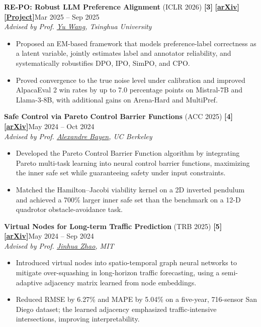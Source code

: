 \documentclass[10pt,letterpaper]{article}
\newcommand{\ulink}[2]{\href{#1}{\underline{#2}}}
\newcommand{\linktag}[2]{\textbf{[\ulink{#1}{#2}]}}
\newcommand{\project}[3]{%
  \vspace{6pt}%
  {#1}\hfill #2\\
  \textit{#3}\par\vspace{2pt}}
\begin{document}
\project{\textbf{RE-PO: Robust LLM Preference Alignment} (ICLR 2026) \textbf{[3]}
         \linktag{https://arxiv.org/abs/2509.24159}{arXiv} \linktag{https://repo-alignment.github.io/}{Project}}{Mar 2025 -- Sep 2025}
        {Advised by Prof. \ulink{https://web.ee.tsinghua.edu.cn/wangyu/en/}{Yu Wang}, Tsinghua University}
\begin{itemize}
  \item Proposed an EM-based framework that models preference-label correctness as a latent variable, jointly estimates
    label and annotator reliability, and systematically robustifies DPO, IPO, SimPO, and CPO.
  \item Proved convergence to the true noise level under calibration and improved AlpacaEval 2 win rates by up to 7.0
    percentage points on Mistral-7B and Llama-3-8B, with additional gains on Arena-Hard and MultiPref.
\end{itemize}

\project{\textbf{Safe Control via Pareto Control Barrier Functions} (ACC 2025) \textbf{[4]}
         \linktag{https://arxiv.org/abs/2410.04260}{arXiv}}{May 2024 -- Oct 2024}
        {Advised by Prof. \ulink{https://bayen.berkeley.edu/alex-bayen}{Alexandre Bayen}, UC Berkeley}
\begin{itemize}
  \item Developed the Pareto Control Barrier Function algorithm by integrating Pareto multi-task learning into neural
    control barrier functions, maximizing the inner safe set while guaranteeing safety under input constraints.
  \item Matched the Hamilton--Jacobi viability kernel on a 2D inverted pendulum and achieved a 700\% larger inner safe
    set than the benchmark on a 12-D quadrotor obstacle-avoidance task.
\end{itemize}

\project{\textbf{Virtual Nodes for Long-term Traffic Prediction} (TRB 2025) \textbf{[5]}
         \linktag{https://arxiv.org/abs/2501.10048}{arXiv}}{May 2024 -- Sep 2024}
        {Advised by Prof. \ulink{https://zhaojinhua.com/}{Jinhua Zhao}, MIT}
\begin{itemize}
  \item Introduced virtual nodes into spatio-temporal graph neural networks to mitigate over-squashing in long-horizon
    traffic forecasting, using a semi-adaptive adjacency matrix learned from node embeddings.
  \item Reduced RMSE by 6.27\% and MAPE by 5.04\% on a five-year, 716-sensor San Diego dataset; the learned adjacency
    emphasized traffic-intensive intersections, improving interpretability.
\end{itemize}
\end{document}
